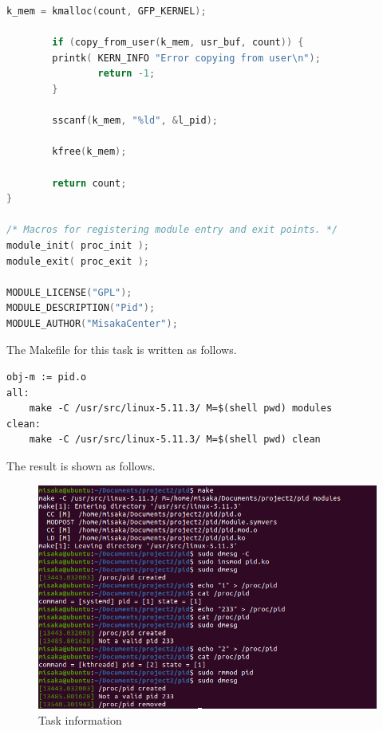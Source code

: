 \documentclass[UTF8,10pt,a4paper]{article}
\theoremstyle{Problem}
\theoremstyle{Solution}
\begin{document}
\begin{lstlisting}[language = c]
        k_mem = kmalloc(count, GFP_KERNEL);

        if (copy_from_user(k_mem, usr_buf, count)) {
		printk( KERN_INFO "Error copying from user\n");
                return -1;
        }

        sscanf(k_mem, "%ld", &l_pid);

        kfree(k_mem);

        return count;
}

/* Macros for registering module entry and exit points. */
module_init( proc_init );
module_exit( proc_exit );

MODULE_LICENSE("GPL");
MODULE_DESCRIPTION("Pid");
MODULE_AUTHOR("MisakaCenter");
\end{lstlisting}

The Makefile for this task is written as follows.
\begin{lstlisting}
obj-m := pid.o
all:
	make -C /usr/src/linux-5.11.3/ M=$(shell pwd) modules
clean:
	make -C /usr/src/linux-5.11.3/ M=$(shell pwd) clean
\end{lstlisting}

The result is shown as follows.
\begin{figure}[H]
    \centering
    \includegraphics[width=400pt]{pid.png}
    \caption{Task information}
    \label{3}
\end{figure}
\end{document}
